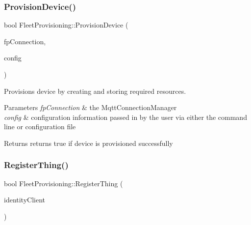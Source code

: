 \subsubsection{\texorpdfstring{Provision\+Device()}{ProvisionDevice()}}
{\footnotesize\ttfamily bool Fleet\+Provisioning\+::\+Provision\+Device (\begin{DoxyParamCaption}\item[{std\+::shared\+\_\+ptr$<$ \hyperlink{class_aws_1_1_iot_1_1_device_client_1_1_shared_crt_resource_manager}{Shared\+Crt\+Resource\+Manager} $>$}]{fp\+Connection,  }\item[{\hyperlink{struct_aws_1_1_iot_1_1_device_client_1_1_plain_config}{Plain\+Config} \&}]{config }\end{DoxyParamCaption})}



Provisions device by creating and storing required resources. 


\begin{DoxyParams}{Parameters}
{\em fp\+Connection} & the Mqtt\+Connection\+Manager \\
\hline
{\em config} & configuration information passed in by the user via either the command line or configuration file \\
\hline
\end{DoxyParams}
\begin{DoxyReturn}{Returns}
returns true if device is provisioned successfully 
\end{DoxyReturn}
\mbox{\label{class_aws_1_1_iot_1_1_device_client_1_1_fleet_provisioning_a2221768ad4f91ac5c593485de33c5c80}} 
\subsubsection{\texorpdfstring{Register\+Thing()}{RegisterThing()}}
{\footnotesize\ttfamily bool Fleet\+Provisioning\+::\+Register\+Thing (\begin{DoxyParamCaption}\item[{Iotidentity\+::\+Iot\+Identity\+Client}]{identity\+Client }\end{DoxyParamCaption})\hspace{0.3cm}{\ttfamily [private]}}



